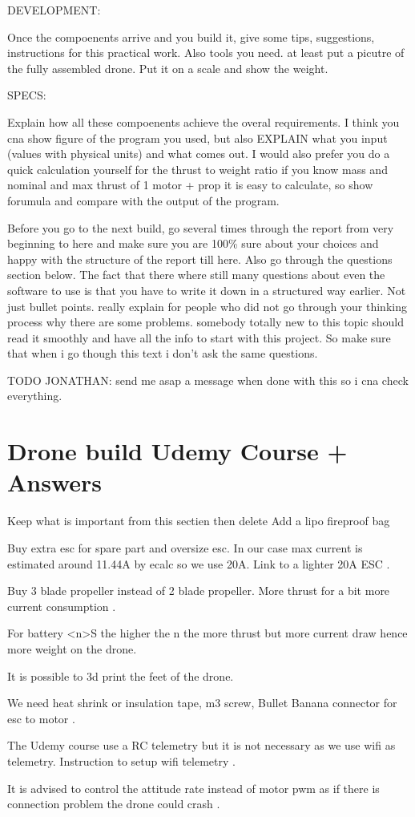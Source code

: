 DEVELOPMENT:

Once the compoenents arrive and you build it, give some tips, suggestions, instructions for this practical work. Also tools you need. at least put a picutre of the fully assembled drone. Put it on a scale and show the weight.

SPECS:

Explain how all these compoenents achieve the overal requirements. I think you cna show figure of the program you used, but also EXPLAIN what you input (values with physical units) and what comes out. I would also prefer you do a quick calculation yourself for the thrust to weight ratio if you know mass and nominal and max thrust of 1 motor + prop it is easy to calculate, so show forumula and compare with the output of the program.


Before you go to the next build, go several times through the report from very beginning to here and make sure you are 100\% sure about your choices and happy with the structure of the report till here. Also go through the questions section below. The fact that there where still many questions about even the software to use is that you have to write it down in a structured way earlier. Not just bullet points. really explain for people who did not go through your thinking process why there are some problems. somebody totally new to this topic should read it smoothly and have all the info to start with this project. So make sure that when i go though this text i don't ask the same questions.

{\color{red}TODO JONATHAN: send me asap a message when done with this so i cna check everything. \\}

\section{Drone build Udemy Course + Answers}
 {\color{red} Keep what is important from this sectien then delete}
Add a lipo fireproof bag

Buy extra esc for spare part and oversize esc. In our case max current is estimated around 11.44A by ecalc so we use 20A. Link to a lighter 20A ESC \cite{bangood_racerstar}.

Buy 3 blade propeller instead of 2 blade propeller. More thrust for a bit more current consumption \cite{bangood_propeller_3_blade}.

For battery <n>S the higher the n the more thrust but more current draw hence more weight on the drone.

It is possible to 3d print the feet of the drone.

We need heat shrink or insulation tape, m3 screw, Bullet Banana connector for esc to motor \cite{bangood_bullet_banana_connector}.

The Udemy course use a RC telemetry but it is not necessary as we use wifi as telemetry. Instruction to setup wifi telemetry \cite{emlid_ardupilot_installation}.


It is advised to control the attitude rate instead of motor pwm as if there is connection problem the drone could crash \cite{px4_low_level_control}.
